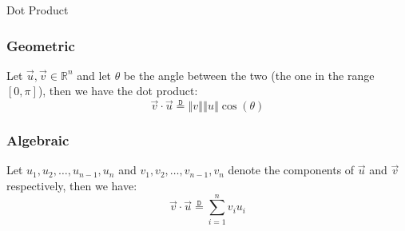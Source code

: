 \documentclass{standalone}
\begin{document}
\begin{defn*}{Dot Product}
  \subsubsection*{Geometric}
  Let $ \vec{u}, \vec{v} \in \mathbb{R} ^{n}$ and let $\theta$ be the angle between the two (the one in the range $ \left[ 0, \pi \right]$), then we have the dot product: 
\[
	\vec{v}  \cdot  \vec{u} \stackrel{\mathtt{D}}{=} \left\Vert v \right\Vert \left\Vert u \right\Vert \cos  \left( \theta \right) 
\]
\subsubsection*{Algebraic}
 Let $ u_{1} , u_{2} , \dotsc  , u_{n - 1} , u_{n}$ and $ v_{1} , v_{2} , \dotsc  , v_{n - 1} , v_{n}$ denote the components of $ \vec{u}$ and $ \vec{v}$ respectively, then we have:
\[
	\vec{v}  \cdot  \vec{u} \stackrel{\mathtt{D}}{=} \sum_{i=1}^{n} v_{i} u_{i}
\]



\end{defn*}
\end{document}
